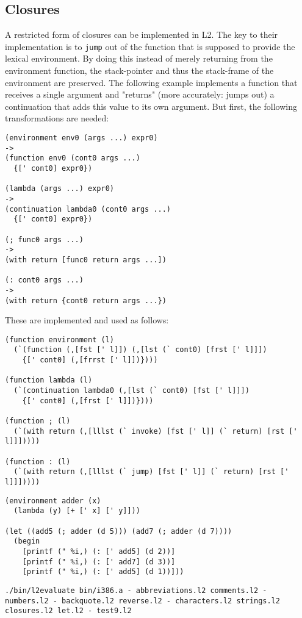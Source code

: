 \documentclass[twocolumn,landscape]{article}
\begin{document}
    \subsection{Closures}\label{sec:closures}
      A restricted form of closures can be implemented in L2. The key to their implementation is to \lstinline{jump} out of the function that is supposed to provide the lexical environment. By doing this instead of merely returning from the environment function, the stack-pointer and thus the stack-frame of the environment are preserved. The following example implements a function that receives a single argument and "returns" (more accurately: jumps out) a continuation that adds this value to its own argument. But first, the following transformations are needed:
      \begin{lstlisting}
(environment env0 (args ...) expr0)
->
(function env0 (cont0 args ...)
  {[' cont0] expr0})

(lambda (args ...) expr0)
->
(continuation lambda0 (cont0 args ...)
  {[' cont0] expr0})

(; func0 args ...)
->
(with return [func0 return args ...])

(: cont0 args ...)
->
(with return {cont0 return args ...})
      \end{lstlisting}
      These are implemented and used as follows:
      \begin{lstlisting}[caption={closures.l2}]
(function environment (l)
  (`(function (,[fst [' l]]) (,[lst (` cont0) [frst [' l]]])
    {[' cont0] (,[frrst [' l]])})))

(function lambda (l)
  (`(continuation lambda0 (,[lst (` cont0) [fst [' l]]])
    {[' cont0] (,[frst [' l]])})))

(function ; (l)
  (`(with return (,[lllst (` invoke) [fst [' l]] (` return) [rst [' l]]]))))

(function : (l)
  (`(with return (,[lllst (` jump) [fst [' l]] (` return) [rst [' l]]]))))
      \end{lstlisting}
      
      \begin{lstlisting}[caption={test9.l2}]
(environment adder (x)
  (lambda (y) [+ [' x] [' y]]))

(let ((add5 (; adder (d 5))) (add7 (; adder (d 7))))
  (begin
    [printf (" %i,) (: [' add5] (d 2))]
    [printf (" %i,) (: [' add7] (d 3))]
    [printf (" %i,) (: [' add5] (d 1))]))
      \end{lstlisting}
      
      \begin{lstlisting}[caption={shell}]
./bin/l2evaluate bin/i386.a - abbreviations.l2 comments.l2 - numbers.l2 - backquote.l2 reverse.l2 - characters.l2 strings.l2 closures.l2 let.l2 - test9.l2
      \end{lstlisting}
\end{document}
